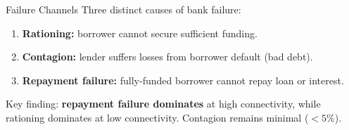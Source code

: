 \begin{frame}{Failure Channels}
  Three distinct causes of bank failure:
  \begin{enumerate}
    \item \textbf{Rationing:} borrower cannot secure sufficient funding.
    \item \textbf{Contagion:} lender suffers losses from borrower default (bad debt).
    \item \textbf{Repayment failure:} fully-funded borrower cannot repay loan or interest.
  \end{enumerate}
  \vspace{0.3cm}
  Key finding: \textbf{repayment failure dominates} at high connectivity, while rationing dominates at low connectivity. Contagion remains minimal ($<5\%$).
\end{frame}



